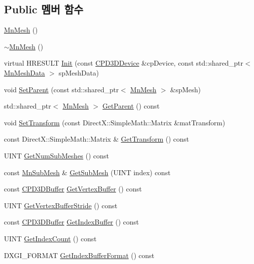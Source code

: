 \subsection*{Public 멤버 함수}
\begin{DoxyCompactItemize}
\item 
\hyperlink{class_m_n_l_1_1_mn_mesh_a5a2ad03a6baa88d7563df3cc17e36b12}{Mn\+Mesh} ()
\item 
\hyperlink{class_m_n_l_1_1_mn_mesh_a35cdd9cc547aa3e32ba67f09b74bac01}{$\sim$\+Mn\+Mesh} ()
\item 
virtual H\+R\+E\+S\+U\+LT \hyperlink{class_m_n_l_1_1_mn_mesh_a694b6dfe0ae3ed0f97bcf055525b8659}{Init} (const \hyperlink{namespace_m_n_l_a1eec210db8f309a4a9ac0d9658784c31}{C\+P\+D3\+D\+Device} \&cp\+Device, const std\+::shared\+\_\+ptr$<$ \hyperlink{class_m_n_l_1_1_mn_mesh_data}{Mn\+Mesh\+Data} $>$ sp\+Mesh\+Data)
\item 
void \hyperlink{class_m_n_l_1_1_mn_mesh_a05cb7889b4f8ce6ed32334082ea9ac4c}{Set\+Parent} (const std\+::shared\+\_\+ptr$<$ \hyperlink{class_m_n_l_1_1_mn_mesh}{Mn\+Mesh} $>$ \&sp\+Mesh)
\item 
std\+::shared\+\_\+ptr$<$ \hyperlink{class_m_n_l_1_1_mn_mesh}{Mn\+Mesh} $>$ \hyperlink{class_m_n_l_1_1_mn_mesh_a04364fc880cefe0dfbf99c4196d25cfd}{Get\+Parent} () const
\item 
void \hyperlink{class_m_n_l_1_1_mn_mesh_a47ce5880e4d73b11887c83921824f43d}{Set\+Transform} (const Direct\+X\+::\+Simple\+Math\+::\+Matrix \&mat\+Transform)
\item 
const Direct\+X\+::\+Simple\+Math\+::\+Matrix \& \hyperlink{class_m_n_l_1_1_mn_mesh_a6e1178196c41f872f432a65a02a786e5}{Get\+Transform} () const
\item 
U\+I\+NT \hyperlink{class_m_n_l_1_1_mn_mesh_aee1f713bc53686879397376a064cdf2b}{Get\+Num\+Sub\+Meshes} () const
\item 
const \hyperlink{struct_m_n_l_1_1_mn_sub_mesh}{Mn\+Sub\+Mesh} \& \hyperlink{class_m_n_l_1_1_mn_mesh_ab765c79f606507de6d1be69f51ec2502}{Get\+Sub\+Mesh} (U\+I\+NT index) const
\item 
const \hyperlink{namespace_m_n_l_aab9c90a8c27ac6410a9cc7cd89efeef1}{C\+P\+D3\+D\+Buffer} \hyperlink{class_m_n_l_1_1_mn_mesh_a3c8f3380c7ea8a5927a61e667400e9a8}{Get\+Vertex\+Buffer} () const
\item 
U\+I\+NT \hyperlink{class_m_n_l_1_1_mn_mesh_aa8706a7d5ca39d4666867c24d5a3be5a}{Get\+Vertex\+Buffer\+Stride} () const
\item 
const \hyperlink{namespace_m_n_l_aab9c90a8c27ac6410a9cc7cd89efeef1}{C\+P\+D3\+D\+Buffer} \hyperlink{class_m_n_l_1_1_mn_mesh_a2e8ea6dbb3625a0700e092a7293bd6e7}{Get\+Index\+Buffer} () const
\item 
U\+I\+NT \hyperlink{class_m_n_l_1_1_mn_mesh_aba80f0a52329029f340414c71cdfe8c8}{Get\+Index\+Count} () const
\item 
D\+X\+G\+I\+\_\+\+F\+O\+R\+M\+AT \hyperlink{class_m_n_l_1_1_mn_mesh_a48b3d12651791c91095a883aef2e577d}{Get\+Index\+Buffer\+Format} () const
\end{DoxyCompactItemize}
